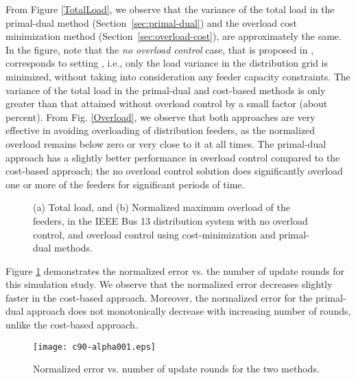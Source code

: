 \documentclass[12pt,draftcls,onecolumn]{IEEEtran}
\begin{document}
From Figure \ref{TotalLoad}, we observe that the variance of the total load in the primal-dual method (Section~\ref{sec:primal-dual}) and the overload cost minimization method (Section~\ref{sec:overload-cost}), are approximately the same. In the figure, note that the \textit{no overload control} case, that is proposed in \cite{GTL13}, corresponds to setting , i.e., only the load variance in the distribution grid is minimized, without taking into consideration any feeder capacity constraints. The variance of the total load in the primal-dual and cost-based methods is only greater than that attained without overload control by a small factor (about  percent).  From Fig. \ref{Overload}, we observe that both approaches are very effective in avoiding overloading of distribution feeders, as the normalized overload remains below zero or very close to it at all times. The primal-dual approach has a slightly better performance in overload control compared to the cost-based approach; the no overload control solution does significantly overload one or more of the feeders for significant periods of time.\\
\begin{figure}
\centering
{}
\caption{(a) Total load, and (b) Normalized maximum overload of the feeders, in the IEEE Bus 13 distribution system with no overload control, and overload control using cost-minimization and primal-dual methods.}
\vspace{-5mm}
\end{figure}
\indent Figure \ref{NormError} demonstrates the normalized error vs. the number of update rounds for this simulation study. We observe that the normalized error decreases slightly faster in the cost-based approach. Moreover, the normalized error for the primal-dual approach does not monotonically decrease with increasing number of rounds, unlike the cost-based approach.
\begin{figure}
\centering
\texttt{[image: c90-alpha001.eps]}
\caption{Normalized error vs. number of update rounds for the two methods.}
\label{NormError}
\end{figure}
\end{document}
